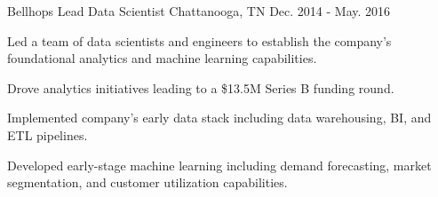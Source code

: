 \begin{cventries}
    \cventry
        {Bellhops} %
        {Lead Data Scientist} %
        {Chattanooga, TN} %
        {Dec. 2014 - May. 2016} %
        {
        \begin{cvitems} %
            \item {Led a team of data scientists and engineers to establish the company's foundational analytics and machine learning capabilities.}
            \item {Drove analytics initiatives leading to a \$13.5M Series B funding round.}
            \item {Implemented company's early data stack including data warehousing, BI, and ETL pipelines.}
            \item {Developed early-stage machine learning including demand forecasting, market segmentation, and customer utilization capabilities.}
        \end{cvitems}
        }




    \end{cventries}
